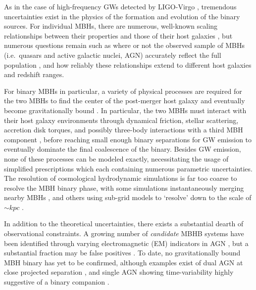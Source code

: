 \documentclass[useAMS, usenatbib]{mnras}
\begin{document}
    As in the case of high-frequency GWs detected by LIGO-Virgo \needcite{}, tremendous uncertainties exist in the physics of the formation and evolution of the binary sources.  For individual MBHs, there are numerous, well-known scaling relationships between their properties and those of their host galaxies , but numerous questions remain such as where or not the observed sample of MBHs (i.e.~quasars and active galactic nuclei, AGN) accurately reflect the full population , and how reliably these relationships extend to different host galaxies and redshift ranges.

    For binary MBHs in particular, a variety of physical processes are required for the two MBHs to find the center of the post-merger host galaxy and eventually become gravitationally bound .  In particular, the two MBHs must interact with their host galaxy environments through dynamical friction, stellar scattering, accretion disk torques, and possibly three-body interactions with a third MBH component \needcite{}, before reaching small enough binary separations for GW emission to eventually dominate the final coalescence of the binary.  Besides GW emission, none of these processes can be modeled exactly, necessitating the usage of simplified prescriptions which each containing numerous parametric uncertainties.  The resolution of cosmological hydrodynamic simulations is far too coarse to resolve the MBH binary phase, with some simulations instantaneously merging nearby MBHs , and others using sub-grid models to `resolve' down to the scale of $\sim kpc$ .

    In addition to the theoretical uncertainties, there exists a substantial dearth of observational constraints.  A growing number of \textit{candidate} MBHB systems have been identified through varying electromagnetic (EM) indicators in AGN \needcite{}, but a substantial fraction may be false positives \needcite{}.  To date, no gravitationally bound MBH binary has yet to be confirmed, although examples exist of dual AGN at close projected separation , and single AGN showing time-variability highly suggestive of a binary companion .
\end{document}
